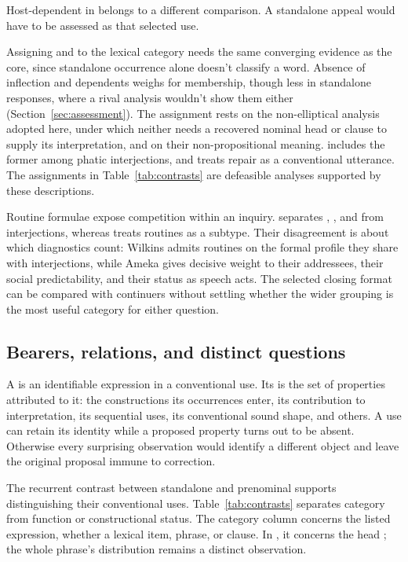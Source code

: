\documentclass[12pt]{article}
\begin{document}
Host-dependent  in  belongs to
a different comparison. A standalone appeal  would have
to be assessed as that selected use.

Assigning  and  to the lexical category
needs the same converging evidence as the core, since standalone occurrence
alone doesn't classify a word. Absence of inflection and dependents weighs for
membership, though less in standalone responses, where a rival analysis
wouldn't show them either (Section~\ref{sec:assessment}). The assignment rests on the
non-elliptical analysis adopted here, under which neither needs a recovered
nominal head or clause to supply its interpretation, and on their
non-propositional meaning. \textcite[114]{ameka1992}
includes the former among phatic interjections, and
\textcite[152]{wilkins1992} treats repair  as a conventional
utterance. The assignments in Table~\ref{tab:contrasts} are defeasible
analyses supported by these descriptions.

Routine formulae expose competition within an inquiry.
\textcite[108--110]{ameka1992} separates , ,
and  from interjections, whereas
\textcite[142]{wilkins1992} treats routines as a subtype. Their
disagreement is about which diagnostics count: Wilkins admits routines on
the formal profile they share with interjections, while Ameka gives
decisive weight to their addressees, their social predictability, and their
status as speech acts. The selected closing format can be
compared with continuers without settling whether the wider grouping
is the most useful category for either question.

\subsection{Bearers, relations, and distinct questions}

A  is an identifiable expression in a conventional use.
Its  is the set of properties attributed to it: the
constructions its occurrences enter, its contribution to interpretation,
its sequential uses, its conventional sound shape, and others. A use can retain its identity
while a proposed property turns out to be absent. Otherwise every
surprising observation would identify a different object and leave the
original proposal immune to correction.

The recurrent contrast between standalone and prenominal 
supports distinguishing their conventional uses. Table~\ref{tab:contrasts}
separates category from function or constructional status. The category
column concerns the listed expression, whether a lexical item, phrase,
or clause. In , it concerns the head ;
the whole phrase's distribution remains a distinct observation.
\end{document}

